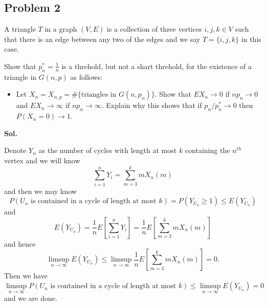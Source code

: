 \documentclass[lang=en,11pt,a4paper,citestyle =authoryear]{elegantpaper}
\begin{document}
\subsection*{Problem 2} 
A triangle $T$ in a graph $(V,E)$ is a collection of three vertices $i,j,k\in V$ such that there is an edge between any two of the edges and we say $T=\{i,j,k\}$ in this case.\par
Show that $p^*_n = \tfrac{1}{n}$ is a threhold, but not a shart threhold, for the existence of a triangle in $G(n,p)$ as follows:
\begin{itemize}
    \item Let $X_n = X_{n,p} = \#\{\text{triangles in }G(n,p_n)\}$. Show that $EX_n \to 0$ if $np_n \to 0$ and $EX_n \to \infty$ if $np_n \to \infty$. Explain why this shows that if $p_n/p_n^* \to 0$ then $P(X_n= 0) \to 1$.
\end{itemize}
\vspace{0.5em}
\textbf{Sol.} \par
Denote $Y_n$ as the number of cycles with length at most $k$ containing the $n^{th}$ vertex and we will know
\[
\sum\limits_{i=1}^n Y_i = \sum\limits_{m=3}^k mX_n(m)
\]
and then we may know
\[
P(U_n\text{ is contained in a cycle of length at most }k ) = P(Y_{U_n} \geq 1) \leq E(Y_{U_n})
\]
and
\[
E(Y_{U_n}) = \dfrac{1}{n}E\left[\sum\limits_{i=1}^n Y_i\right] = \dfrac{1}{n}E\left[\sum\limits_{m=3}^k mX_n(m)\right] 
\]
and hence
\[
\limsup_{n\to\infty} E(Y_{U_n}) \leq \limsup_{n\to\infty}\dfrac{1}{n}E\left[\sum\limits_{m=3}^k mX_n(m)\right]  = 0.
\]
Then we have
\[
\limsup_{n\to\infty} P(U_n\text{ is contained in a cycle of length at most }k ) \leq \limsup_{n\to\infty} E(Y_{U_n}) = 0
\]
and we are done.
\par 
\vspace{0.5em}
\end{document}
